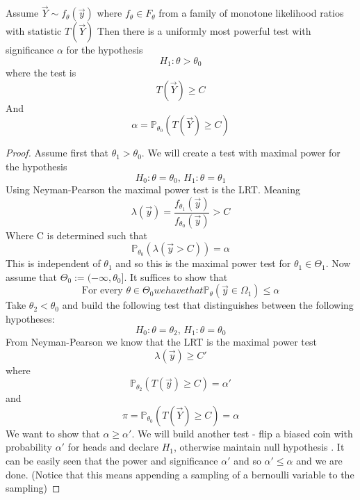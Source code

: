 \documentclass[../main.tex]{subfiles}
\begin{document}
\begin{claim}
Assume $\overrightarrow{Y}\sim f_{\theta}(\overrightarrow{y})$ where $f_{\theta}\in F_{\theta}$ from a family of monotone likelihood ratios with statistic $T(\overrightarrow{Y})$ Then there is a uniformly most powerful test with significance $\alpha$ for the hypothesis 
\[H_1:\theta>\theta_0\]
where the test is
\[T(\overrightarrow{Y})\geq C\]
And
\[\alpha = \mathbb{P}_{\theta_0}(T(\overrightarrow{Y})\geq C)\]
\end{claim}
\begin{proof}
Assume first that $\theta_1>\theta_0$. We will create a test with maximal power for the hypothesis 
\[H_0:\theta=\theta_0\text{, } H_1:\theta=\theta_1\]
Using Neyman-Pearson the maximal power test is the LRT. Meaning
\[\lambda(\overrightarrow{y})=\frac{f_{\theta_1}(\overrightarrow{y})}{f_{\theta_0}(\overrightarrow{y})}>C\]
Where C is determined such that
\[\mathbb{P}_{\theta_0}(\lambda(\overrightarrow{y}>C))  =\alpha\]
This is independent of $\theta_1$ and so this is the maximal power test for $\theta_1\in\Theta_1$.
Now assume that $\Theta_0:=(-\infty, \theta_0]$. It suffices to show that
\[\text{For every }\theta\in\Theta_0 we have that \mathbb{P}_{\theta}(\overrightarrow{y}\in\Omega_1)\leq\alpha \]
Take $\theta_2<\theta_0$ and build the following test that distinguishes between the following hypotheses:
\[H_0:\theta=\theta_2\text{, }H_1:\theta=\theta_0\]
From Neyman-Pearson we know that the LRT is the maximal power test
\[\lambda(\overrightarrow{y})\geq C'\]
where 
\[\mathbb{P}_{\theta_2}(T(\overrightarrow{y})\geq C) = \alpha'\]
and
\[\pi = \mathbb{P}_{\theta_0}(T(\overrightarrow{Y})\geq C) = \alpha\]
We want to show that $\alpha\geq\alpha'$. We will build another test - flip a biased coin with probability $\alpha'$ for heads and declare $H_1$, otherwise maintain null hypothesis . It can be easily seen that the power and significance $\alpha'$ and so $\alpha'\leq\alpha$ and we are done. (Notice that this means appending a sampling of a bernoulli variable to the sampling)
\end{proof}
\end{document}
